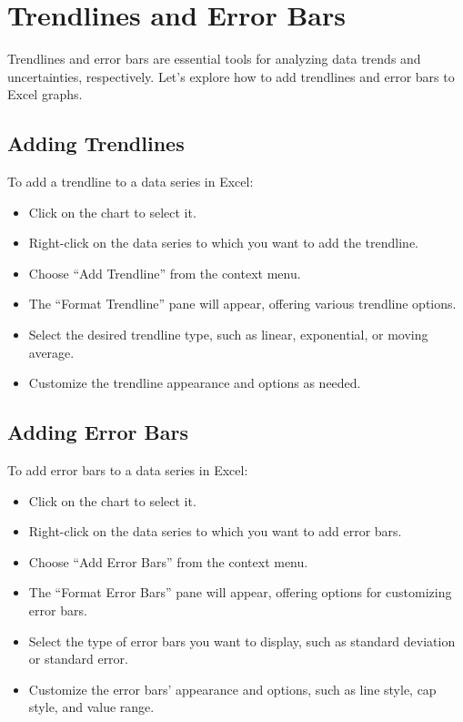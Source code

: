 \documentclass[
]{book}
\providecommand{\tightlist}{%
  \setlength{\itemsep}{0pt}\setlength{\parskip}{0pt}}
\begin{document}
\hypertarget{trendlines-and-error-bars}{%
\section{Trendlines and Error Bars}\label{trendlines-and-error-bars}}

Trendlines and error bars are essential tools for analyzing data trends and uncertainties, respectively. Let's explore how to add trendlines and error bars to Excel graphs.

\hypertarget{adding-trendlines}{%
\subsection{Adding Trendlines}\label{adding-trendlines}}

To add a trendline to a data series in Excel:

\begin{itemize}
\tightlist
\item
  Click on the chart to select it.
\item
  Right-click on the data series to which you want to add the trendline.
\item
  Choose ``Add Trendline'' from the context menu.
\item
  The ``Format Trendline'' pane will appear, offering various trendline options.
\item
  Select the desired trendline type, such as linear, exponential, or moving average.
\item
  Customize the trendline appearance and options as needed.
\end{itemize}

\hypertarget{adding-error-bars}{%
\subsection{Adding Error Bars}\label{adding-error-bars}}

To add error bars to a data series in Excel:

\begin{itemize}
\tightlist
\item
  Click on the chart to select it.
\item
  Right-click on the data series to which you want to add error bars.
\item
  Choose ``Add Error Bars'' from the context menu.
\item
  The ``Format Error Bars'' pane will appear, offering options for customizing error bars.
\item
  Select the type of error bars you want to display, such as standard deviation or standard error.
\item
  Customize the error bars' appearance and options, such as line style, cap style, and value range.
\end{itemize}
\end{document}
